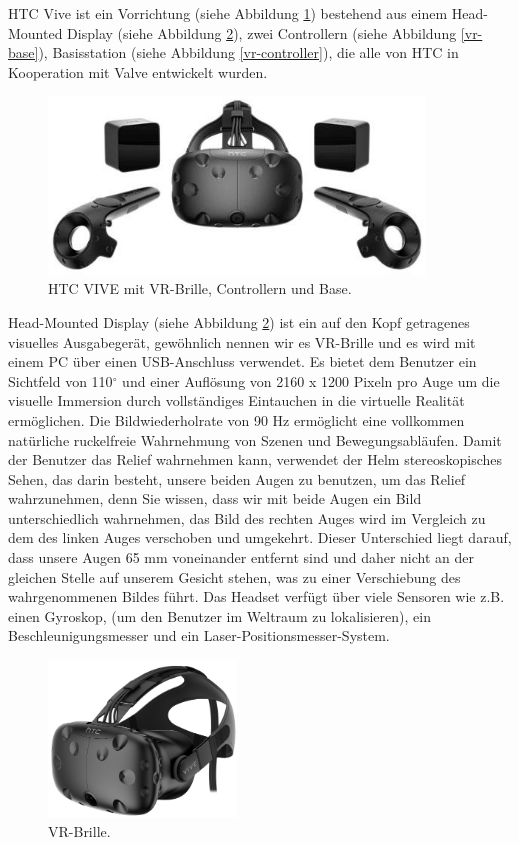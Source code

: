 HTC Vive ist ein Vorrichtung (siehe Abbildung \ref{htc-base}) bestehend aus einem Head-Mounted Display (siehe Abbildung \ref{vr-brille}), zwei Controllern (siehe Abbildung \ref{vr-base}), Basisstation (siehe Abbildung \ref{vr-controller}), die alle von HTC in Kooperation mit Valve entwickelt wurden.
\begin{figure}[h] \centering
\includegraphics[width=10cm]{Images/htc-base.png} 
\caption[HTC VIVE mit VR-Brille, Controllern und Base.]{ HTC VIVE mit VR-Brille, Controllern und Base\cite{vive19}. }
\label{htc-base} 
\end{figure}


Head-Mounted Display (siehe Abbildung \ref{vr-brille}) ist ein auf den Kopf getragenes visuelles Ausgabegerät, gewöhnlich nennen wir es VR-Brille und es wird mit einem PC über einen USB-Anschluss verwendet.
Es bietet dem Benutzer ein Sichtfeld von 110$^\circ$ und einer Auflösung von 2160 x 1200 Pixeln pro Auge um die visuelle Immersion durch vollständiges Eintauchen in die virtuelle Realität ermöglichen. 
Die Bildwiederholrate von 90 Hz ermöglicht eine vollkommen natürliche ruckelfreie Wahrnehmung von Szenen und Bewegungsabläufen. 
Damit der Benutzer das Relief wahrnehmen kann, verwendet der Helm stereoskopisches Sehen, das darin besteht, unsere beiden Augen zu benutzen, um das Relief wahrzunehmen, denn Sie wissen, dass wir mit beide Augen ein  Bild unterschiedlich wahrnehmen, das Bild des rechten Auges wird im Vergleich zu dem des linken Auges verschoben und umgekehrt. 
Dieser Unterschied liegt darauf, dass unsere Augen 65 mm voneinander entfernt sind und daher nicht an der gleichen Stelle auf unserem Gesicht stehen, was zu einer Verschiebung des wahrgenommenen Bildes führt. 
Das Headset verfügt über viele Sensoren wie z.B. einen Gyroskop, (um den Benutzer im Weltraum zu lokalisieren), ein Beschleunigungsmesser und ein Laser-Positionsmesser-System. \\


\begin{figure}[h] \centering
\includegraphics[width=5cm]{Images/vr-brille.png} 
\caption[VR-Brille]{ VR-Brille\cite{vive19}. }
\label{vr-brille} 
\end{figure}


